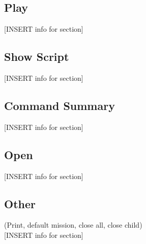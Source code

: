         \subsection{Play}
        [INSERT info for section]

        \subsection{Show Script}
        [INSERT info for section]

        \subsection{Command Summary}
        [INSERT info for section]

        \subsection{Open}
        [INSERT info for section]

        \subsection{Other}
        (Print, default mission, close all, close child)\\
        
        [INSERT info for section]
